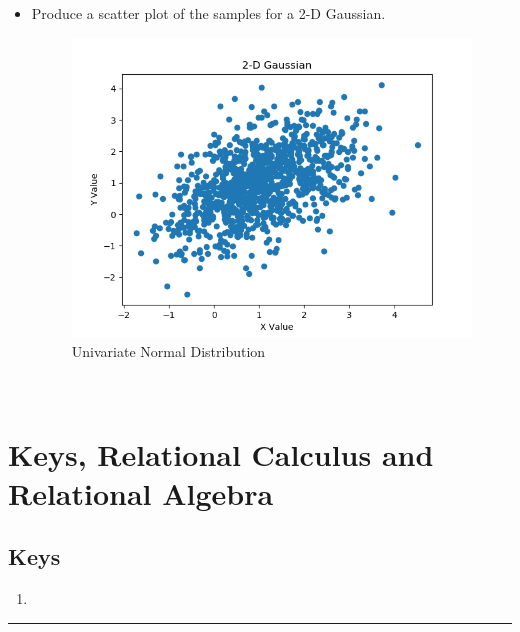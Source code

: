 \documentclass{article}
\begin{document}
\begin{itemize}
\item Produce a scatter plot of the samples for a 2-D Gaussian.\\
\begin{figure}[h!]
	\centering
	\includegraphics[scale = 0.6]{GaussianScatterPlot.png}
	\caption{Univariate Normal Distribution}
\end{figure}\\



\end{itemize}
\section{Keys, Relational Calculus and Relational Algebra}
\subsection{Keys}
\begin{enumerate}
	\item 
\end{enumerate}
\noindent\rule[0.25\baselineskip]{\textwidth}{1pt}
\end{document}
